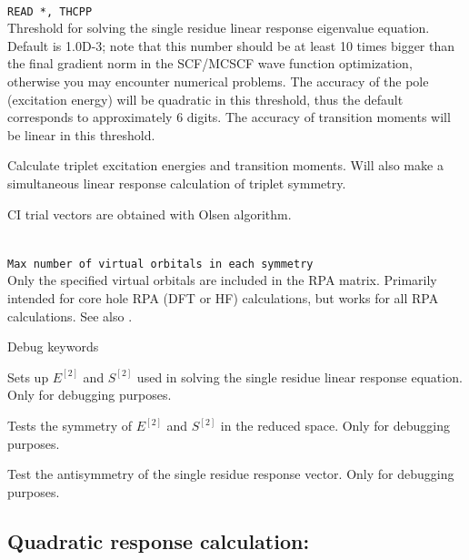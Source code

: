 \begin{description}
\item{}\\
\verb|READ *, THCPP|\\
Threshold for solving the single residue linear response eigenvalue equation.
Default is 1.0D-3; note that this number should be at least 10 times
bigger than the final gradient norm in the SCF/MCSCF
wave function optimization, otherwise you may encounter
numerical problems.
The accuracy of the pole (excitation energy) will be
quadratic in this threshold, thus the default corresponds to approximately
6 digits. The accuracy of transition moments will be linear in this threshold.

\item{} Calculate triplet excitation energies and transition moments.
Will also make a simultaneous linear response calculation of triplet symmetry.

\item{}
CI trial vectors are obtained with Olsen algorithm.

\item{}\\
\verb|Max number of virtual orbitals in each symmetry|\\
Only the specified virtual orbitals are included in the RPA matrix.
Primarily intended for core hole RPA (DFT or HF) calculations,
but works for all RPA calculations.
See also .

\end{description}

Debug keywords

\begin{description}

\item{} Sets up $E^{\left[2\right]}$
  and $S^{\left[2\right]}$ used in solving the
  single residue linear response equation. Only for debugging purposes.

\item{} Tests the symmetry of $E^{\left[2\right]}$
  and $S^{\left[2\right]}$ in the reduced space.
  Only for debugging purposes.

\item{} Test the antisymmetry of the single residue response
  vector. Only for debugging purposes.

\end{description}

\subsection{Quadratic response calculation: }
\label{sec:quadraticrsp}


